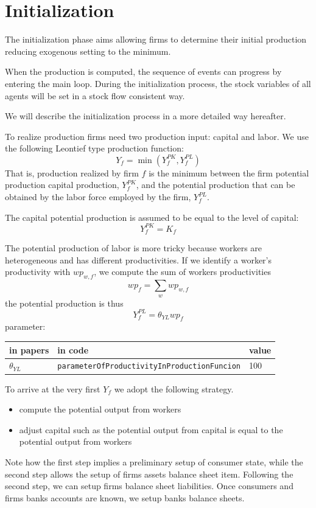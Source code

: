 \documentclass{article}
\begin{document}
\newpage 
\newpage
\section{Initialization}
The initialization phase aims allowing firms to determine their initial production reducing exogenous setting to the minimum. 

When the production is computed, the sequence of events can progress by entering the main loop. During the initialization process, the stock variables of all agents will be set in a stock flow consistent way.

We will describe the initialization process in a more detailed way hereafter.

To realize production firms need two production input: capital and labor. We use the following Leontief type production function:
\[
Y_f=\min(Y_f^{PK},Y_f^{PL})
\]
That is, production realized by firm $f$ is the minimum between the firm potential production capital production, $Y_f^{PK}$, and the potential production that can be obtained by the labor force employed by the firm, $Y_f^{PL}$. 


The capital potential production is assumed to be equal to the level of capital:
\[
	Y^{PK}_f=K_f
\]

The potential production of labor is more tricky because workers are heterogeneous and has different productivities.
If we identify a worker's productivity with $wp_{w,f}$, we compute the sum of workers productivities
\[
	wp_f=\sum_{w}wp_{w,f}
\]
the potential production is thus
\[
	Y^{PL}_f=\theta_{YL}wp_f
\]
parameter:\\
\begin{tabular}{l l l}
	\hline
	in papers& in code&value\\
	\hline
	\hline
$\theta_{YL}$&\verb+parameterOfProductivityInProductionFuncion+&100\\
	\hline
\end{tabular}

\vskip5mm
To arrive at the very first $Y_f$ we adopt the following strategy. 
\begin{itemize}
	\item compute the potential output from workers
	\item adjust capital such as the potential output from capital is equal to the potential output from workers 
\end{itemize}

Note how the first step implies a preliminary setup of consumer state, while the second step allows the setup of firms assets balance sheet item. 
Following the second step, we can setup firms balance sheet liabilities.
Once consumers and firms banks accounts are known, we setup banks balance sheets.
\end{document}
